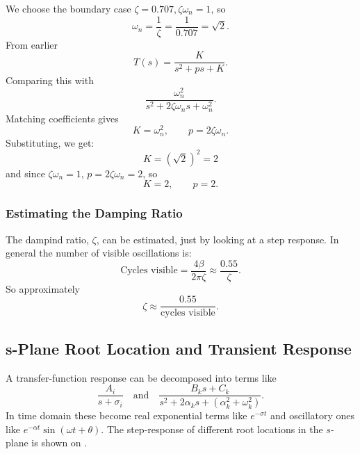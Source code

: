 We choose the boundary case $\zeta = \num{0,707}, \zeta\omega_n = 1$, so
\begin{equation*}
  \omega_n = \frac{1}{\zeta} = \frac{1}{\num{0,707}} = \sqrt{2}
.\end{equation*}
From earlier
\begin{equation*}
  T(s) = \frac{K}{s^2 + ps + K}
.\end{equation*}
Comparing this with
\begin{equation*}
  \frac{\omega_n^2}{s^2 + 2\zeta \omega_n s + \omega_n^2}
.\end{equation*}
Matching coefficients gives
\begin{equation*}
  K = \omega_n^2, \qquad p = 2 \zeta \omega_n
.\end{equation*}
Substituting, we get:
\begin{equation*}
  K = \left( \sqrt{2} \right)^2 = 2
\end{equation*}
and since $\zeta \omega_n = 1$, $p = 2 \zeta \omega_n = 2$, so
\begin{equation*}
  K = 2, \qquad p = 2
.\end{equation*}

\subsubsection{Estimating the Damping Ratio}
The dampind ratio, $\zeta$, can be estimated, just by looking at a step response.
In general the number of visible oscillations is:
\begin{equation*}
  \text{Cycles visible} = \frac{4\beta}{2\pi \zeta} \approx \frac{\num{0,55} }{\zeta}
.\end{equation*}
So approximately
\begin{equation*}
  \zeta \approx \frac{\num{0,55} }{\text{cycles visible}}
.\end{equation*}


\subsection{s-Plane Root Location and Transient Response}
A transfer-function response can be decomposed into terms like
\begin{equation*}
  \frac{A_i}{s + \sigma_i} \quad \text{and}\quad \frac{B_k s + C_k}{s^2 + 2 \alpha_k s + \left( \alpha_k^2 + \omega_k^2 \right)}
.\end{equation*}
In time domain these become real exponential terms like $e^{-\sigma t}$ and oscillatory ones like $e^{-\alpha t} \sin \left( \omega t + \theta \right)$.
The step-response of different root locations in the $s$-plane is shown on .

